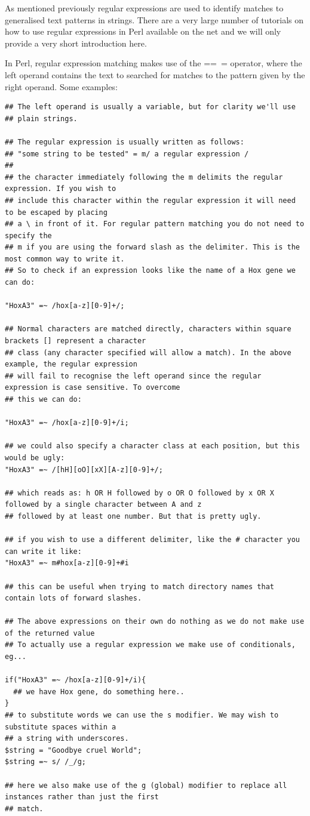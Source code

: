 \documentclass[11pt]{article}
\begin{document}
As mentioned previously regular expressions are used to identify matches
to generalised text patterns in strings. There are a very large number
of tutorials on how to use regular expressions in Perl available on the
net and we will only provide a very short introduction here.

In Perl, regular expression matching makes use of the ==~= operator,
where the left operand contains the text to searched for matches to the
pattern given by the right operand. Some examples:


\begin{verbatim}
## The left operand is usually a variable, but for clarity we'll use
## plain strings.

## The regular expression is usually written as follows:
## "some string to be tested" = m/ a regular expression /
##
## the character immediately following the m delimits the regular expression. If you wish to
## include this character within the regular expression it will need to be escaped by placing
## a \ in front of it. For regular pattern matching you do not need to specify the
## m if you are using the forward slash as the delimiter. This is the most common way to write it.
## So to check if an expression looks like the name of a Hox gene we can do:

"HoxA3" =~ /hox[a-z][0-9]+/;

## Normal characters are matched directly, characters within square brackets [] represent a character
## class (any character specified will allow a match). In the above example, the regular expression
## will fail to recognise the left operand since the regular expression is case sensitive. To overcome
## this we can do:

"HoxA3" =~ /hox[a-z][0-9]+/i;

## we could also specify a character class at each position, but this would be ugly:
"HoxA3" =~ /[hH][oO][xX][A-z][0-9]+/;

## which reads as: h OR H followed by o OR O followed by x OR X followed by a single character between A and z
## followed by at least one number. But that is pretty ugly.

## if you wish to use a different delimiter, like the # character you can write it like:
"HoxA3" =~ m#hox[a-z][0-9]+#i

## this can be useful when trying to match directory names that contain lots of forward slashes.

## The above expressions on their own do nothing as we do not make use of the returned value
## To actually use a regular expression we make use of conditionals, eg...

if("HoxA3" =~ /hox[a-z][0-9]+/i){
  ## we have Hox gene, do something here..
}
## to substitute words we can use the s modifier. We may wish to substitute spaces within a
## a string with underscores.
$string = "Goodbye cruel World";
$string =~ s/ /_/g;

## here we also make use of the g (global) modifier to replace all instances rather than just the first
## match.
\end{verbatim}
\end{document}
